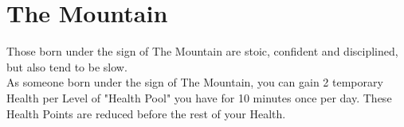 \section{The Mountain}

Those born under the sign of The Mountain are stoic, confident and disciplined, but also tend to be slow.\\
As someone born under the sign of The Mountain, you can gain 2 temporary Health per Level of "Health Pool" you have for 10 minutes once per day. These Health Points are reduced before the rest of your Health.\\